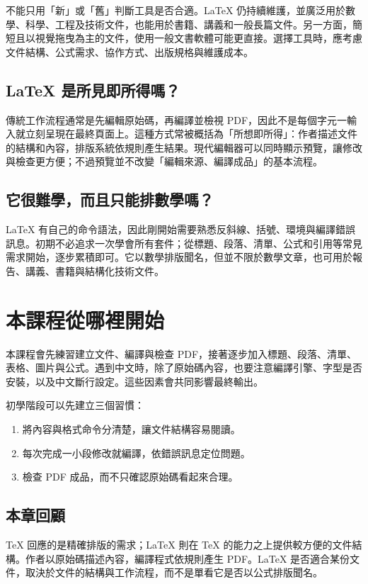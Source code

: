不能只用「新」或「舊」判斷工具是否合適。LaTeX 仍持續維護，並廣泛用於數學、科學、工程及技術文件，也能用於書籍、講義和一般長篇文件。另一方面，簡短且以視覺拖曳為主的文件，使用一般文書軟體可能更直接。選擇工具時，應考慮文件結構、公式需求、協作方式、出版規格與維護成本。

\subsection{LaTeX 是所見即所得嗎？}

傳統工作流程通常是先編輯原始碼，再編譯並檢視 PDF，因此不是每個字元一輸入就立刻呈現在最終頁面上。這種方式常被概括為「所想即所得」：作者描述文件的結構和內容，排版系統依規則產生結果。現代編輯器可以同時顯示預覽，讓修改與檢查更方便；不過預覽並不改變「編輯來源、編譯成品」的基本流程。

\subsection{它很難學，而且只能排數學嗎？}

LaTeX 有自己的命令語法，因此剛開始需要熟悉反斜線、括號、環境與編譯錯誤訊息。初期不必追求一次學會所有套件；從標題、段落、清單、公式和引用等常見需求開始，逐步累積即可。它以數學排版聞名，但並不限於數學文章，也可用於報告、講義、書籍與結構化技術文件。

\section{本課程從哪裡開始}

本課程會先練習建立文件、編譯與檢查 PDF，接著逐步加入標題、段落、清單、表格、圖片與公式。遇到中文時，除了原始碼內容，也要注意編譯引擎、字型是否安裝，以及中文斷行設定。這些因素會共同影響最終輸出。

初學階段可以先建立三個習慣：
\begin{enumerate}
    \item 將內容與格式命令分清楚，讓文件結構容易閱讀。
    \item 每次完成一小段修改就編譯，依錯誤訊息定位問題。
    \item 檢查 PDF 成品，而不只確認原始碼看起來合理。
\end{enumerate}

\subsection*{本章回顧}

TeX 回應的是精確排版的需求；LaTeX 則在 TeX 的能力之上提供較方便的文件結構。作者以原始碼描述內容，編譯程式依規則產生 PDF。LaTeX 是否適合某份文件，取決於文件的結構與工作流程，而不是單看它是否以公式排版聞名。

